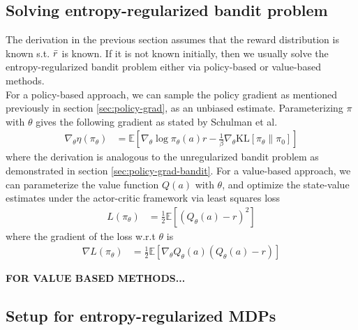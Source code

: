 \documentclass[12pt]{report}
\begin{document}

\subsection{Solving entropy-regularized bandit problem}

The derivation in the previous section assumes that the reward distribution is known s.t. $\Bar{r}$ is known. If it is not known initially, then we usually solve the entropy-regularized bandit problem either via policy-based or value-based methods.\\

For a policy-based approach, we can sample the policy gradient as mentioned previously in section \ref{sec:policy-grad}, as an unbiased estimate. Parameterizing $\pi$ with $\theta$ gives the following gradient as stated by Schulman et al. \cite{schulman2017equivalence}
\begin{align}
    \nabla_\theta \eta(\pi_\theta)&=\mathbb{E}\left[\nabla_\theta \log \pi_\theta(a)r-\frac{1}{\beta}\nabla_\theta\text{KL}[\pi_\theta\|\pi_0]\right]
\end{align}
where the derivation is analogous to the unregularized bandit problem as demonstrated in section \ref{sec:policy-grad-bandit}. For a value-based approach, we can parameterize the value function $Q(a)$ with $\theta$, and optimize the state-value estimates under the actor-critic framework via least squares loss
\begin{align}
    L(\pi_\theta)&=\frac{1}{2}\mathbb{E}\left[(Q_\theta(a)-r)^2\right]
\end{align}
where the gradient of the loss w.r.t $\theta$ is
\begin{align}
    \nabla L(\pi_\theta)&=\frac{1}{2}\mathbb{E}\left[\nabla_\theta Q_\theta(a)(Q_\theta(a)-r)\right]
\end{align}

\textbf{FOR VALUE BASED METHODS...}

\subsection{Setup for entropy-regularized MDPs} \label{sec:entropy-mdp}
\end{document}
